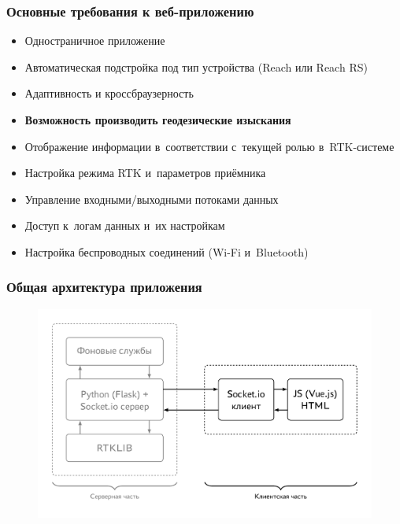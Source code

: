 \documentclass[xetex,с,aspectratio=169]{beamer}
\begin{document}
%
%
\begin{frame}
  \frametitle{Основные требования к веб-приложению}
  
  \large
  
  \begin{itemize}
    \setlength\itemsep{0.5em}
    \item Одностраничное приложение
    \item Автоматическая подстройка под тип устройства (Reach или Reach RS)
    \item Адаптивность и кроссбраузерность
  \end{itemize}
  \begin{center}
    \vskip -0.7cm
    \color{ifmoblue}{\rule{.5\textwidth}{0.5pt}}
  \end{center}
  \vskip -0.5cm
  \begin{itemize}
    \setlength\itemsep{0.5em}
    \item \textbf{Возможность производить геодезические изыскания}
    \item Отображение информации в~соответствии с~текущей ролью в~RTK-системе
    \item Настройка режима RTK и~параметров приёмника
    \item Управление входными/выходными потоками данных
    \item Доступ к~логам данных и~их настройкам
    \item Настройка беспроводных соединений (Wi-Fi и~Bluetooth)
  \end{itemize}
\end{frame}


%
%
\begin{frame}
  \frametitle{Общая архитектура приложения}
  \vskip -0.5cm
  \begin{figure}[h]
    \centering
    \includegraphics[width=.75\textwidth]{../img/tikz/system-architecture/pic}
  \end{figure}
\end{frame}
\end{document}
